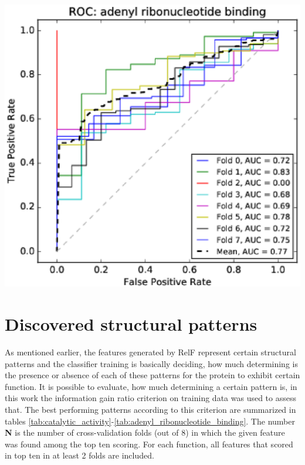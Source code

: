 \documentclass[11pt,twoside,a4paper]{book}
\newenvironment{Figure}
  {\par\medskip\noindent\minipage{\linewidth}}
  {\endminipage\par\medskip}
\begin{document}
\begin{multicols}{2}
\begin{Figure}\begin{center}\includegraphics[width=\linewidth]{figures/roc_adenyl_ribonucleotide_binding}\label{fig:roc_adenyl_ribonucleotide_binding}\end{center}\end{Figure}
\end{multicols}

\section{Discovered structural patterns}
As mentioned earlier, the features generated by RelF represent certain structural patterns 
and the classifier training is basically deciding,
how much determining is the presence or absence of each of these patterns for the protein to exhibit certain function.
It is possible to evaluate, how much determining a certain pattern is,
in this work the information gain ratio criterion on training data was used to assess that.
The best performing patterns according to this criterion are summarized in tables \ref{tab:catalytic_activity}-\ref{tab:adenyl_ribonucleotide_binding}.
The number \textbf{N} is the number of cross-validation folds (out of 8) in which the given feature was found
among the top ten scoring.
For each function, all features that scored in top ten in at least 2 folds are included.
\end{document}
